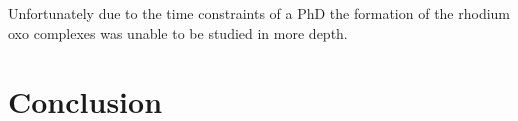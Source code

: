 Unfortunately due to the time constraints of a PhD the formation of the rhodium oxo complexes was unable to be studied in more depth.  

\section{Conclusion}

















